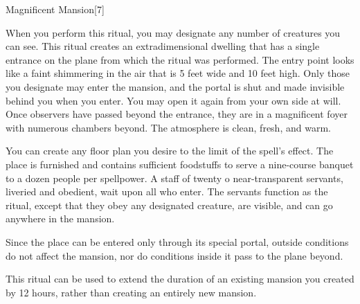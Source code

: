 \begin{spellsection}{Magnificent Mansion}[7]
    \begin{spellheader}
    \end{spellheader}
    \begin{spellcontent}
        \begin{spelltargetinginfo}
        \end{spelltargetinginfo}
        \begin{spelleffects}
            \spellspecial When you perform this ritual, you may designate any number of creatures you can see.
            \spelleffect This ritual creates an extradimensional dwelling that has a single entrance on the plane from which the ritual was performed. The entry point looks like a faint shimmering in the air that is 5 feet wide and 10 feet high. Only those you designate may enter the mansion, and the portal is shut and made invisible behind you when you enter. You may open it again from your own side at will. Once observers have passed beyond the entrance, they are in a magnificent foyer with numerous chambers beyond. The atmosphere is clean, fresh, and warm.
            \par You can create any floor plan you desire to the limit of the spell's effect. The place is furnished and contains sufficient foodstuffs to serve a nine-course banquet to a dozen people per spellpower. A staff of twenty o
            near-transparent servants, liveried and obedient, wait upon all who enter. The servants function as the  ritual, except that they obey any designated creature, are visible, and can go anywhere in the mansion.
            \spelldur \durext \dismissable
        \end{spelleffects}
    \end{spellcontent}
    \begin{spellfooter}
        \spellnotes Since the place can be entered only through its special portal, outside conditions do not affect the mansion, nor do conditions inside it pass to the plane beyond.

        This ritual can be used to extend the duration of an existing mansion you created by 12 hours, rather than creating an entirely new mansion.
    \end{spellfooter}
    \begin{spellaugments}
    \end{spellaugments}
\end{spellsection}

